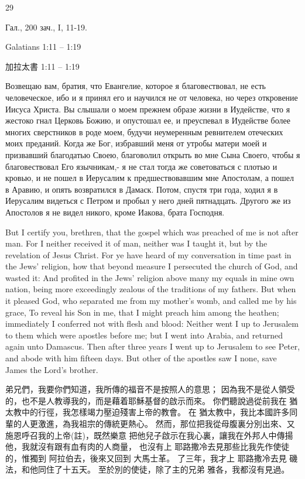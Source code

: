 29

\onehalfspacing %

\doublespacing %

\Large%

Гал., 200 зач., I, 11-19.

Galatians 1:11 -- 1:19

加拉太書 1:11 -- 1:19

Возвещаю вам, братия, что Евангелие, которое я благовествовал, не есть человеческое,
ибо и я принял его и научился не от человека, но через откровение Иисуса Христа.
Вы слышали о моем прежнем образе жизни в Иудействе, что я жестоко гнал Церковь Божию, и опустошал ее,
и преуспевал в Иудействе более многих сверстников в роде моем, будучи неумеренным ревнителем отеческих моих преданий.
Когда же Бог, избравший меня от утробы матери моей и призвавший благодатью Своею, благоволил
открыть во мне Сына Своего, чтобы я благовествовал Его язычникам,- я не стал тогда же советоваться с плотью и кровью,
и не пошел в Иерусалим к предшествовавшим мне Апостолам, а пошел в Аравию, и опять возвратился в Дамаск.
Потом, спустя три года, ходил я в Иерусалим видеться с Петром и пробыл у него дней пятнадцать.
Другого же из Апостолов я не видел никого, кроме Иакова, брата Господня. 

But I certify you, brethren, that the gospel which was preached of me is not after man.
For I neither received it of man, neither was I taught it, but by the revelation of Jesus Christ.
For ye have heard of my conversation in time past in the Jews' religion, how that beyond measure I persecuted the church of God, and wasted it:
And profited in the Jews' religion above many my equals in mine own nation, being more exceedingly zealous of the traditions of my fathers.
But when it pleased God, who separated me from my mother's womb, and called me by his grace,
To reveal his Son in me, that I might preach him among the heathen; immediately I conferred not with flesh and blood:
Neither went I up to Jerusalem to them which were apostles before me; but I went into Arabia, and returned again unto Damascus.
Then after three years I went up to Jerusalem to see Peter, and abode with him fifteen days.
But other of the apostles saw I none, save James the Lord's brother.

弟兄們，我要你們知道，我所傳的福音不是按照人的意思；
因為我不是從人領受的，也不是人教導我的，而是藉着耶穌基督的啟示而來。
你們聽說過從前我在 猶太教中的行徑，我怎樣竭力壓迫殘害上帝的教會。
在 猶太教中，我比本國許多同輩的人更激進，為我祖宗的傳統更熱心。
然而，那位把我從母腹裏分別出來、又施恩呼召我的上帝(註)，既然樂意
把他兒子啟示在我心裏，讓我在外邦人中傳揚他，我就沒有跟有血有肉的人商量，
也沒有上 耶路撒冷去見那些比我先作使徒的，惟獨到 阿拉伯去，後來又回到 大馬士革。
了三年，我才上 耶路撒冷去見 磯法，和他同住了十五天。
至於別的使徒，除了主的兄弟 雅各，我都沒有見過。 
